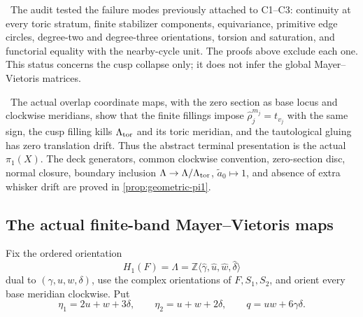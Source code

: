 \begin{test}
\Verified\ The audit tested the failure modes previously attached to C1--C3:
continuity at every toric stratum, finite stabilizer components, equivariance,
primitive edge circles, degree-two and degree-three orientations, torsion and
saturation, and functorial equality with the nearby-cycle unit.  The proofs
above exclude each one.  This status concerns the cusp collapse only; it does
not infer the global Mayer--Vietoris matrices.
\end{test}

\begin{auditrecord}
\label{record:vankampen}
\Verified\ The actual overlap coordinate maps, with the zero section as
base locus and clockwise meridians, show that the
finite fillings impose $\widehat\rho_j^{m_j}=t_{v_j}$ with the same sign,
the cusp filling kills $\Lambda_{\rm tor}$ and its toric meridian, and the
tautological gluing has zero translation drift.  Thus the abstract terminal
presentation is the actual $\pi_1(X)$.  The deck generators, common clockwise
convention, zero-section disc, normal closure, boundary inclusion
$\Lambda\to\Lambda/\Lambda_{\rm tor}$,
$\widetilde a_0\mapsto1$, and absence of extra whisker drift are proved in
\cref{prop:geometric-pi1}.
\end{auditrecord}

\subsection{The actual finite-band Mayer--Vietoris maps}

Fix the ordered orientation
\[
H_1(F)=\Lambda=
\mathbb Z\langle\widehat\gamma,\widehat u,
                    \widehat w,\widehat\delta\rangle
\]
dual to $(\gamma,u,w,\delta)$, use the complex orientations of
$F,S_1,S_2$, and orient every base meridian clockwise.  Put
\[
 \eta_1=2u+w+3\delta,
 \qquad \eta_2=u+w+2\delta,
 \qquad q=uw+6\gamma\delta.
\tag{MV.1}
\]


